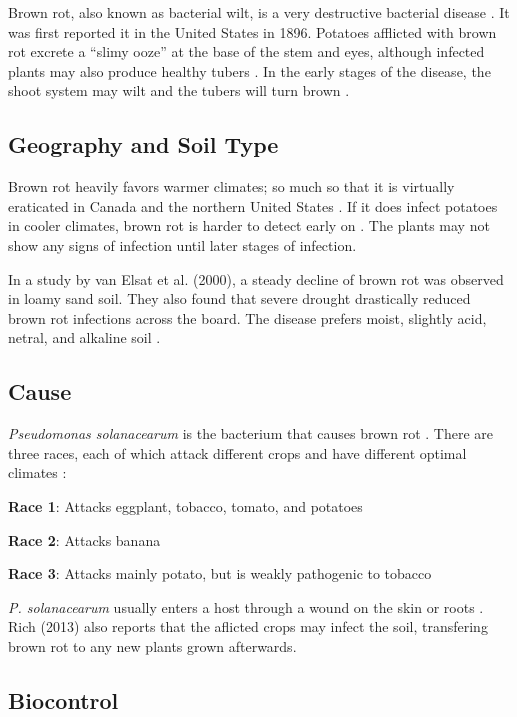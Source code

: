 \documentclass[letterpaper, 12pt]{report}
\begin{document}
Brown rot, also known as bacterial wilt, is a very destructive bacterial disease \autocite{rich2013potato}. It was first reported it in the United States in 1896. Potatoes afflicted with brown rot excrete a ``slimy ooze'' at the base of the stem and eyes, although infected plants may also produce healthy tubers \autocite{rich2013potato}. In the early stages of the disease, the shoot system may wilt and the tubers will turn brown \autocite{kabeil2008potato}.

\subsection{Geography and Soil Type}

Brown rot heavily favors warmer climates; so much so that it is virtually eraticated in Canada and the northern United States \autocite{rich2013potato}. If it does infect potatoes in cooler climates, brown rot is harder to detect early on \autocite{kabeil2008potato}. The plants may not show any signs of infection until later stages of infection.

In a study by van Elsat et al. (2000), a steady decline of brown rot was observed in loamy sand soil. They also found that severe drought drastically reduced brown rot infections across the board. The disease prefers moist, slightly acid, netral, and alkaline soil \autocite{rich2013potato}.

\subsection{Cause}

\emph{Pseudomonas solanacearum} is the bacterium that causes brown rot \autocite{van2000survival}. There are three races, each of which attack different crops and have different optimal climates \autocite{rich2013potato}:

\textbf{Race 1}: Attacks eggplant, tobacco, tomato, and potatoes

\textbf{Race 2}: Attacks banana

\textbf{Race 3}: Attacks mainly potato, but is weakly pathogenic to tobacco

\emph{P. solanacearum} usually enters a host through a wound on the skin or roots \autocite{rich2013potato}. Rich (2013) also reports that the aflicted crops may infect the soil, transfering brown rot to any new plants grown afterwards.

\subsection{Biocontrol}
\end{document}
